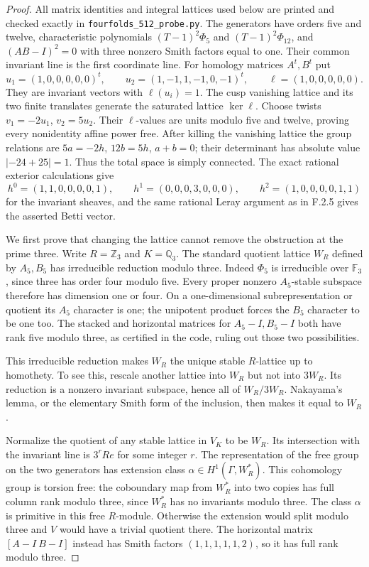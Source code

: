 \begin{proof}
All matrix identities and integral lattices used below are
printed and checked exactly in
\texttt{fourfolds\_512\_probe.py}.
The generators have orders five and twelve, characteristic
polynomials $(T-1)^2\Phi_5$ and $(T-1)^2\Phi_{12}$,
and $(AB-I)^2=0$ with three nonzero Smith factors equal to one.
Their common invariant line is the first coordinate line.
For homology matrices $A^t,B^t$ put
\[
 u_1=(1,0,0,0,0,0)^t,\qquad
 u_2=(1,-1,1,-1,0,-1)^t,
 \qquad \ell=(1,0,0,0,0,0).
\]
They are invariant vectors with $\ell(u_i)=1$.
The cusp vanishing lattice and its two finite translates
generate the saturated lattice $\ker\ell$.
Choose twists $v_1=-2u_1$, $v_2=5u_2$.
Their $\ell$-values are units modulo five and twelve, proving
every nonidentity affine power free.
After killing the vanishing lattice the group relations are
$5a=-2h$, $12b=5h$, $a+b=0$; their determinant has absolute
value $|-24+25|=1$.  Thus the total space is simply connected.
The exact rational exterior calculations give
\[
 h^0=(1,1,0,0,0,0,1),\qquad
 h^1=(0,0,0,3,0,0,0),\qquad
 h^2=(1,0,0,0,0,1,1)
\]
for the invariant sheaves, and the same rational Leray
argument as in F.2.5 gives the asserted Betti vector.

We first prove that changing the lattice cannot remove the
obstruction at the prime three.  Write $R=\mathbb Z_3$ and
$K=\mathbb Q_3$.  The standard quotient lattice $W_R$ defined
by $A_5,B_5$ has irreducible reduction modulo three.
Indeed $\Phi_5$ is irreducible over $\mathbb F_3$, since
three has order four modulo five.  Every proper nonzero
$A_5$-stable subspace therefore has dimension one or four.
On a one-dimensional subrepresentation or quotient its
$A_5$ character is one; the unipotent product forces the
$B_5$ character to be one too.  The stacked and horizontal
matrices for $A_5-I,B_5-I$ both have rank five modulo three,
as certified in the code, ruling out those two possibilities.

This irreducible reduction makes $W_R$ the unique stable
$R$-lattice up to homothety.  To see this, rescale another
lattice into $W_R$ but not into $3W_R$.  Its reduction is
a nonzero invariant subspace, hence all of $W_R/3W_R$.
Nakayama's lemma, or the elementary Smith form of the
inclusion, then makes it equal to $W_R$.

Normalize the quotient of any stable lattice in $V_K$ to
be $W_R$.  Its intersection with the invariant line is
$3^rRe$ for some integer $r$.
The representation of the free group on the two generators
has extension class
$\alpha\in H^1(\Gamma,W_R^*)$.
This cohomology group is torsion free: the coboundary map
from $W_R^*$ into two copies has full column rank modulo
three, since $W_R^*$ has no invariants modulo three.
The class $\alpha$ is primitive in this free $R$-module.
Otherwise the extension would split modulo three and $V$
would have a trivial quotient there.  The horizontal
matrix $[A-I\ B-I]$ instead has Smith factors
$(1,1,1,1,1,2)$, so it has full rank modulo three.


\end{proof}
